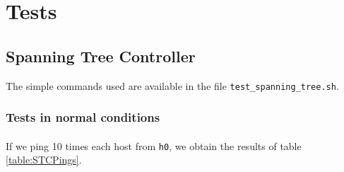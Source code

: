 \documentclass[a4paper, 11pt, oneside]{article}
\begin{document}
\section{Tests}

\subsection{Spanning Tree Controller}
The simple commands used are available in the file \texttt{test\_spanning\_tree.sh}.
\subsubsection{Tests in normal conditions}
\paragraph{}If we ping 10 times each host from \texttt{h0}, we obtain the results of table \ref{table:STCPings}.\\
\end{document}
